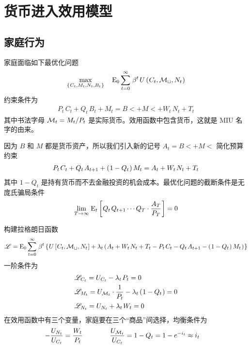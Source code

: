 \section{货币进入效用模型}

\subsection{家庭行为}\label{sec:MIU-household}


家庭面临如下最优化问题
\begin{align*}
    \max_{\bkd{C_t,M_t,N_t,B_t}}\quad \meano\sum^\infty_{t=0}\,\beta^t\,U\bka{C_t, \cal{M_t},N_t}
\end{align*}
约束条件为
\begin{align*}
    P_t\,C_t+Q_t\,B_t+M_t=B\lt+M\lt+W_t\,N_t+T_t
\end{align*}
其中书法字母 \(\cal M_t=M_t/P_t\) 是实际货币。效用函数中包含货币，这就是 MIU 名字的由来。

因为 \(B\) 和 \(M\) 都是货币资产，所以我们引入新的记号 \(A_t=B\lt+M\lt\) 简化预算约束
\begin{align*}
    P_t\,C_t+Q_t\,A\nt+\bka{1-Q_t}M_t=A_t+W_t\,N_t+T_t
\end{align*}
其中 \(1-Q_t\) 是持有货币而不去金融投资的机会成本。最优化问题的截断条件是无庞氏骗局条件
\begin{align*}
    \lim_{T\to\infty}\,\mean_t\bks{Q_t\,Q\nt\cdots Q_T\cdot\dfrac{A_T}{P_T}}=0
\end{align*}

构建拉格朗日函数
\begin{align*}
    \scr L=\meano\sum^\infty_{t=0}\,\beta^t\bkd{U\bks{C_t, \cal{M_t},N_t}+\lambda_t\bka{A_t+W_t\,N_t+T_t-P_t\,C_t-Q_t\,A\nt-\bka{1-Q_t}M_t}}
\end{align*}
一阶条件为
\begin{align*}
    & \scr L_{C_t}=U_{C_t}-\lambda_t\,P_t=0\\
    & \scr L_{M_t}=U_{\cal M_t}\cdot\dfrac{1}{P_t}-\lambda_t\bka{1-Q_t}=0\\
    & \scr L_{N_t}=U_{N_t}+\lambda_t\,W_t=0
\end{align*}
在效用函数中有三个变量，家庭要在三个“商品”间选择，均衡条件为
\begin{align}
    -\dfrac{U_{N_t}}{U_{C_t}}=\dfrac{W_t}{P_t}\qquad\qquad
    \dfrac{U_{\cal M_t}}{U_{C_t}}&=1-Q_t=1-e^{-i_t}\approx i_t\label{eq:MIU-equilibrium}
\end{align}

